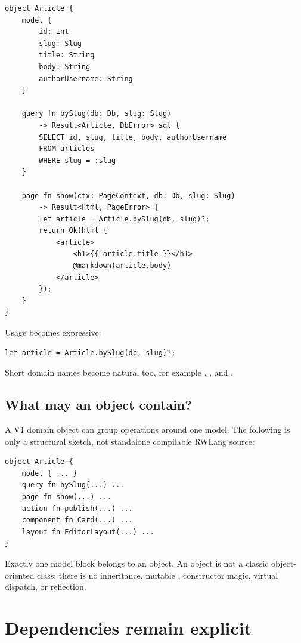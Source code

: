 \begin{lstlisting}[language=RWLang]
object Article {
    model {
        id: Int
        slug: Slug
        title: String
        body: String
        authorUsername: String
    }

    query fn bySlug(db: Db, slug: Slug)
        -> Result<Article, DbError> sql {
        SELECT id, slug, title, body, authorUsername
        FROM articles
        WHERE slug = :slug
    }

    page fn show(ctx: PageContext, db: Db, slug: Slug)
        -> Result<Html, PageError> {
        let article = Article.bySlug(db, slug)?;
        return Ok(html {
            <article>
                <h1>{{ article.title }}</h1>
                @markdown(article.body)
            </article>
        });
    }
}
\end{lstlisting}

Usage becomes expressive:

\begin{lstlisting}[language=RWLang]
let article = Article.bySlug(db, slug)?;
\end{lstlisting}

Short domain names become natural too, for example , , and .

\subsection*{What may an object contain?}

A V1 domain object can group operations around one model. The following is only a structural sketch, not standalone compilable RWLang source:

\begin{lstlisting}
object Article {
    model { ... }
    query fn bySlug(...) ...
    page fn show(...) ...
    action fn publish(...) ...
    component fn Card(...) ...
    layout fn EditorLayout(...) ...
}
\end{lstlisting}

Exactly one model block belongs to an object. An object is not a classic object-oriented class: there is no inheritance, mutable , constructor magic, virtual dispatch, or reflection.

\section{Dependencies remain explicit}

